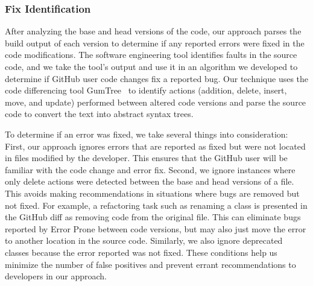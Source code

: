 \documentclass[sigconf,review,anonymous]{acmart}
\newcommand{\tool}{\textsl{tool-recommender-bot}}
\begin{document}
\subsubsection{Fix Identification}

After analyzing the base and head versions of the code, our approach parses the build output of each version to determine if any reported errors were fixed in the code modifications. The software engineering tool identifies faults in the source code, and we take the tool's output and use it in an algorithm we developed to determine if GitHub user code changes fix a reported bug. Our technique uses the code differencing tool GumTree~\cite{GumTree} to identify actions (addition, delete, insert, move, and update) performed between altered code versions and parse the source code to convert the text into abstract syntax trees. 

To determine if an error was fixed, we take several things into consideration: First, our approach ignores errors that are reported as fixed but were not located in files modified by the developer. This ensures that the GitHub user will be familiar with the code change and error fix. Second, we ignore instances where only delete actions were detected between the base and head versions of a file. This avoids making recommendations in situations where bugs are removed but not fixed. For example, a refactoring task such as renaming a class is presented in the GitHub diff as removing code from the original file. This can eliminate bugs reported by Error Prone between code versions, but may also just move the error to another location in the source code. Similarly, we also ignore deprecated classes because the error reported was not fixed. These conditions help us minimize the number of false positives and prevent errant recommendations to developers in our approach.

\end{document}
